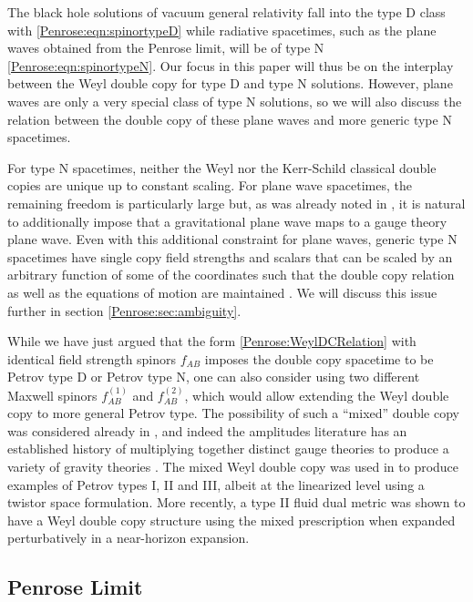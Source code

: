 The black hole solutions of vacuum general relativity fall into the type D class with \eqref{Penrose:eqn:spinortypeD} while radiative spacetimes, such as the plane waves obtained from the Penrose limit, will be of type N \eqref{Penrose:eqn:spinortypeN}. Our focus in this paper will thus be on the interplay between the Weyl double copy for type D and type N solutions. However, plane waves are only a very special class of type N solutions, so we will also discuss the relation between the double copy of these plane waves and more generic type N spacetimes. 

For type N spacetimes, neither the Weyl nor the Kerr-Schild classical double copies are unique up to constant scaling. For plane wave spacetimes, the remaining freedom is particularly large but, as was already noted in \cite{Luna:2018dpt}, it is natural to additionally impose that a gravitational plane wave maps to a gauge theory plane wave.  Even with this additional constraint for plane waves, generic type N spacetimes have single copy field strengths and scalars that can be scaled by an arbitrary function of some of the coordinates such that the double copy relation as well as the equations of motion are maintained \cite{Godazgar:2020zbv}. We will discuss this issue further in section \ref{Penrose:sec:ambiguity}.

While we have just argued that the form \eqref{Penrose:WeylDCRelation} with identical field strength spinors $f_{AB}$
imposes the double copy spacetime to be Petrov type D or Petrov type N, one can also consider using two different
Maxwell spinors $f^{(1)}_{AB}$ and $f^{(2)}_{AB}$, which would allow extending the Weyl double copy to more general
Petrov type. The possibility of such a ``mixed'' double copy was considered already in \cite{Luna:2018dpt}, and
indeed the amplitudes literature has an established history of multiplying together distinct gauge theories to
produce a variety of gravity theories \cite{Bern:2019prr}. The mixed Weyl double copy was used in
\cite{White:2020sfn,Chacon:2021wbr} to produce examples of Petrov types I, II and III, albeit at the linearized
level using a twistor space formulation. More recently, a type II fluid dual metric was shown to have a Weyl double
copy structure \cite{Keeler:2024bdt} using the mixed prescription when expanded perturbatively in a near-horizon
expansion.

\subsection{Penrose Limit}\label{Penrose:sec:Penrosereview}

